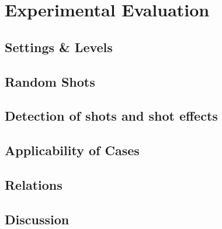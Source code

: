 \section{Experimental Evaluation}\label{sec:experimental}



\subsection{Settings \& Levels}\label{subsec:experimental-settings}





\subsection{Random Shots}\label{subsec:experimental-random-shots}


\subsection{Detection of shots and shot effects}\label{subsec:experimental-effects}



\subsection{Applicability of Cases}\label{subsec:experimental-applicability}


\subsection{Relations}\label{subsec:experimental-predicates}


\subsection{Discussion}\label{subsec:experimental-discussion}



% 

% 


